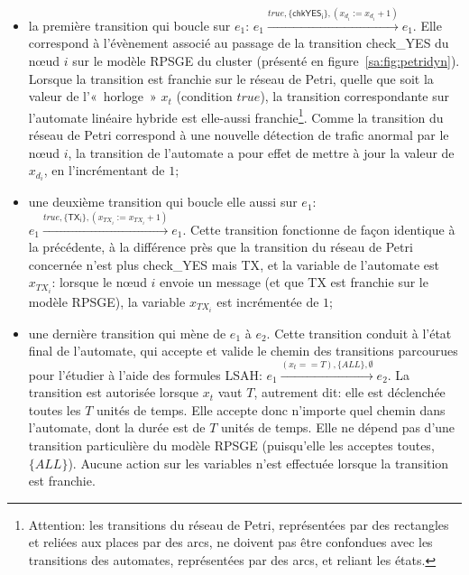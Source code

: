 \begin{itemize}
    \item la première transition qui boucle sur $e_1$: $e_1\xrightarrow{\mathit{true},\{\mathsf{chkYES_i}\},(x_{d_i}:=x_{d_i}+1)}{e_1}$.
        Elle correspond à l'évènement associé au passage de la transition \textsf{check\_YES} du nœud $i$ sur le modèle RPSGE du cluster (présenté en figure~\ref{sa:fig:petridyn}).
        Lorsque la transition est franchie sur le réseau de Petri, quelle que soit la valeur de l'«~horloge~» $x_t$ (condition $\mathit{true}$), la transition correspondante sur l'automate linéaire hybride est elle-aussi franchie\footnote{Attention: les transitions du réseau de Petri, représentées par des rectangles et reliées aux places par des arcs, ne doivent pas être confondues avec les transitions des automates, représentées par des arcs, et reliant les états.}.
        Comme la transition du réseau de Petri correspond à une nouvelle détection de trafic anormal par le nœud $i$, la transition de l'automate a pour effet de mettre à jour la valeur de $x_{d_i}$, en l'incrémentant de $1$;
    \item une deuxième transition qui boucle elle aussi sur $e_1$: $e_1\xrightarrow{\mathit{true},\{\mathsf{TX_i}\},(x_{\mathit{TX}_i}:=x_{\mathit{TX}_i}+1)}{e_1}$.
        Cette transition fonctionne de façon identique à la précédente, à la différence près que la transition du réseau de Petri concernée n'est plus \textsf{check\_YES} mais \textsf{TX}, et la variable de l'automate est $x_{\mathit{TX}_i}$: lorsque le nœud $i$ envoie un message (et que \textsf{TX} est franchie sur le modèle RPSGE), la variable $x_{\mathit{TX}_i}$ est incrémentée de $1$;
    \item une dernière transition qui mène de $e_1$ à $e_2$.
        Cette transition conduit à l'état final de l'automate, qui accepte et valide le chemin des transitions parcourues pour l'étudier à l'aide des formules LSAH: $e_1\xrightarrow{(x_t==T),\{\mathit{ALL}\},\emptyset}{e_2}$.
        La transition est autorisée lorsque $x_t$ vaut $T$, autrement dit: elle est déclenchée toutes les $T$ unités de temps.
        Elle accepte donc n'importe quel chemin dans l'automate, dont la durée est de $T$ unités de temps.
        Elle ne dépend pas d'une transition particulière du modèle RPSGE (puisqu'elle les acceptes toutes, $\{\mathit{ALL}\}$).
        Aucune action sur les variables n'est effectuée lorsque la transition est franchie.
\end{itemize}

